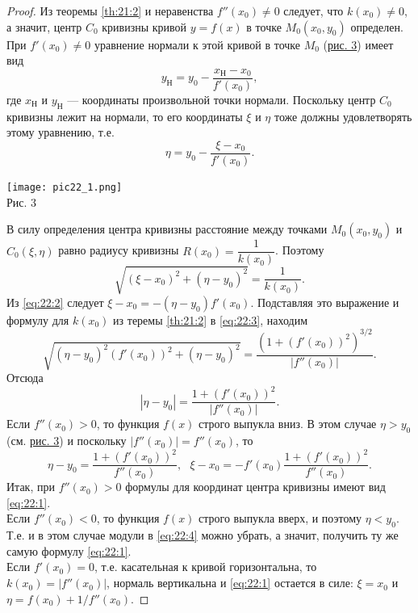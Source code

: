 \documentclass[12pt]{report}
\numberwithin{equation}{section}
\begin{document}
\begin{proof}
Из теоремы \ref{th:21:2} и неравенства $f''(x_0) \neq 0$ следует, что $k(x_0) \neq 0$, а значит, центр $C_0$ кривизны кривой $y = f(x)$ в точке $M_0(x_0,y_0)$ определен. При $f'(x_0) \neq 0$ уравнение нормали к этой кривой в точке $M_0$ (\hyperref[pic:22:1]{рис. 3}) имеет вид
\[ y_{\text{Н}} = y_0 - \frac{x_{\text{Н}} - x_0}{f'(x_0)}, \]
где $x_{\text{Н}}$ и $y_{\text{Н}}$ --- координаты произвольной точки нормали. Поскольку центр $C_0$ кривизны лежит на нормали, то его координаты $\xi$ и $\eta$ тоже должны удовлетворять этому уравнению, т.е.
\begin{equation} \label{eq:22:2}
\eta = y_0 - \frac{\xi - x_0}{f'(x_0)}.
\end{equation}

\begin{center}
\texttt{[image: pic22\_1.png]} \label{pic:22:1}\\
Рис. 3
\end{center}
В силу определения центра кривизны расстояние между точками $M_0(x_0, y_0)$ и $C_0(\xi, \eta)$ равно радиусу кривизны $R(x_0) = \dfrac{1}{k(x_0)}$. Поэтому
\begin{equation} \label{eq:22:3}
\sqrt{(\xi - x_0)^2 + (\eta - y_0)^2} = \frac{1}{k(x_0)}.
\end{equation}
Из \eqref{eq:22:2} следует $\xi - x_0 = -(\eta - y_0) f'(x_0)$. Подставляя это выражение и формулу для $k(x_0)$ из теремы \ref{th:21:2} в \eqref{eq:22:3}, находим
\[ \sqrt{(\eta - y_0)^2 (f'(x_0))^2 + (\eta - y_0)^2} = \frac{\left( 1 + (f'(x_0))^2\right)^{3/2}}{|f''(x_0)|}.\]
Отсюда
\begin{equation} \label{eq:22:4}
|\eta - y_0| = \frac{1 + (f'(x_0))^2}{|f''(x_0)|}.
\end{equation}
Если $f''(x_0) > 0$, то функция $f(x)$ строго выпукла вниз. В этом случае $\eta > y_0$ (см. \hyperref[pic:22:1]{рис. 3}) и поскольку $|f''(x_0)| = f''(x_0)$, то
\[ \eta - y_0 = \frac{1 + (f'(x_0))^2}{f''(x_0)},~~~\xi - x_0 = -f'(x_0)\frac{1 + (f'(x_0))^2}{f''(x_0)}.\]
Итак, при $f''(x_0) > 0$ формулы для координат центра кривизны имеют вид \eqref{eq:22:1}.\\

Если $f''(x_0) < 0$, то функция $f(x)$ строго выпукла вверх, и поэтому $\eta < y_0$. Т.е. и в этом случае модули в \eqref{eq:22:4} можно убрать, а значит, получить ту же самую формулу \eqref{eq:22:1}.\\

Если $f'(x_0) = 0$, т.е. касательная к кривой горизонтальна, то $k(x_0) = |f''(x_0)|$, нормаль вертикальна и \eqref{eq:22:1} остается в силе: $\xi = x_0$ и $\eta = f(x_0) + 1 / f''(x_0)$.
\end{proof}
\end{document}
